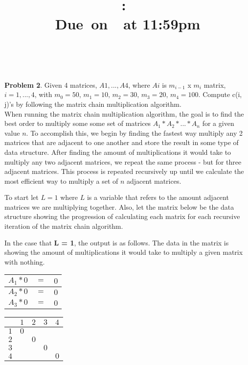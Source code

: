 \documentclass{article}
\title{
    \vspace{2in}
    \textmd{\textbf{\hmwkClass:\ \hmwkTitle}}\\
    \normalsize\vspace{0.1in}\small{Due\ on\ \hmwkDueDate\ at 11:59pm}\\
    \vspace{0.1in}\large{\textit{\hmwkClassInstructor\ \hmwkClassTime}}
    \vspace{3in}
}
\author{\hmwkAuthorName}
\date{}
\begin{document}
\maketitle
\pagebreak


\textbf{Problem 2}. 
Given 4 matrices, $A1, . . . , A4$, where $Ai$ is $m_{i - 1}$ x $m_{i}$ matrix, $i = 1, . . . , 4$, with
$m_{0} = 50$, $m_{1} = 10$, $m_{2} = 30$, $m_{3} = 20$, $m_{4} = 100$. Compute c(i, j)’s by following the matrix chain multiplication algorithm.\\

When running the matrix chain multiplication algorithm, the goal is to find the best order to multiply some some set of matrices $A_{1} * A_{2} * ... * A_{n}$ for a given value $n$. To accomplish this, we begin by finding the fastest way multiply any 2 matrices that are adjacent to one another and store the result in some type of data structure. After finding the amount of multiplications it would take to multiply any two adjacent matrices, we repeat the same process - but for three adjacent matrices. This process is repeated recursively up until we calculate the most efficient way to multiply a set of $n$ adjacent matrices. 

To start let $L = 1$ where $L$ is a variable that refers to the amount adjacent matrices we are multiplying together. Also, let the matrix below be the data structure showing the progression of calculating each matrix for each recursive iteration of the matrix chain algorithm. 

In the case that \textbf{L = 1}, the output is as follows. The data in the matrix is showing the amount of multiplications it would take to multiply a given matrix with nothing. 

\begin{center}
	\begin{tabular}{| c c c |}
		
		\hline
		$A_{1} * 0$ &$=$ &$0$\\
		\hline
		$A_{2} * 0$ &$=$ &$0$ \\
		\hline
		$A_{3} * 0$ &$=$ &$0$ \\
		\hline
	
	\end{tabular}
\end{center}

\begin{center}
	\begin{tabular}{c | c | c | c | c}
	
		&$1$ &$2$ &$3$ &$4$ \\
		\hline
		$1$ &$0$ & & &\\
		\hline
		$2$ & &$0$ & &\\
		\hline
		$3$ & & &$0$ &\\
		\hline
		$4$ & & & &$0$\\
		
	\end{tabular}
\end{center}
\end{document}
